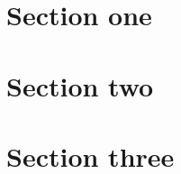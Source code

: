 \documentclass[10pt,a4paper,twocolumn]{article}
\begin{document}
\section{Section one}\lipsum[1-8]
\section{Section two}\lipsum[9-22]
\section{Section three}\lipsum[23-25]
\end{document}
